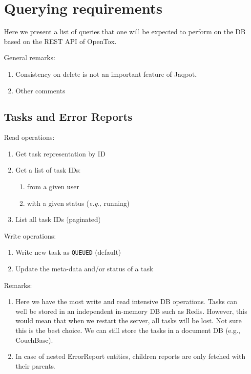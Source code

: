 \section{Querying requirements}



\noindent Here we present a list of queries that one will be expected 
to perform on the DB based on the REST API of OpenTox.

\noindent General remarks:
\begin{enumerate}
 \item Consistency on delete is not an important feature of Jaqpot.
 \item Other comments
\end{enumerate}


\subsection{Tasks and Error Reports}

\noindent Read operations:
\begin{enumerate}
 \item Get task representation by ID
 \item Get a list of task IDs:
    \begin{enumerate}
    \item from a given user
    \item with a given status (\textit{e.g.}, running)
    \end{enumerate}
 \item List all task IDs (paginated)
\end{enumerate}

\noindent Write operations:
\begin{enumerate}
 \item Write new task as \texttt{QUEUED} (default)
 \item Update the meta-data and/or status of a task
\end{enumerate}

\noindent Remarks:
\begin{enumerate}
 \item 	Here we have the most write and read intensive DB 
	operations. Tasks can well be stored in an independent 
	in-memory DB such as Redis. However, this would mean 
	that when we restart the server, all tasks will be lost. 
	Not sure this is the best choice. We can still store the 
	tasks in a document DB (e.g., CouchBase).
 \item 	In case of nested ErrorReport entities, children reports are 
        only fetched with their parents.
\end{enumerate}




